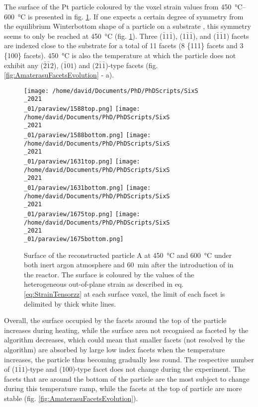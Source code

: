 The surface of the Pt particle coloured by the voxel strain values from \qtyrange{450}{600}{\degreeCelsius} is presented in fig. \ref{fig:AmaterasuB}.
If one expects a certain degree of symmetry from the equilibrium Winterbottom shape of a particle on a substrate \parencite{Winterbottom1967, Boukouvala2021}, this symmetry seems to only be reached at \qty{450}{\degreeCelsius} (fig. \ref{fig:AmaterasuB}).
Three ($\bar{1}1\bar{1}$), (1$\bar{1}\bar{1}$), and ($\bar{1}\bar{1}$1) facets are indexed close to the substrate for a total of 11 facets (8 \{111\} facets and 3 \{100\} facets).
\qty{450}{\degreeCelsius} is also the temperature at which the particle does not exhibit any ($\bar{2}\bar{1}2$), ($\bar{1}01$) and ($2\bar{1}\bar{1}$)-type facets (fig. \ref{fig:AmaterasuFacetsEvolution} - a).

\begin{figure}[!htb]
    \centering
    \texttt{[image: /home/david/Documents/PhD/PhDScripts/SixS\\\_2021\\\_01/paraview/1588top.png]}
    \texttt{[image: /home/david/Documents/PhD/PhDScripts/SixS\\\_2021\\\_01/paraview/1588bottom.png]}
    \texttt{[image: /home/david/Documents/PhD/PhDScripts/SixS\\\_2021\\\_01/paraview/1631top.png]}
    \texttt{[image: /home/david/Documents/PhD/PhDScripts/SixS\\\_2021\\\_01/paraview/1631bottom.png]}
    \texttt{[image: /home/david/Documents/PhD/PhDScripts/SixS\\\_2021\\\_01/paraview/1675top.png]}
    \texttt{[image: /home/david/Documents/PhD/PhDScripts/SixS\\\_2021\\\_01/paraview/1675bottom.png]}
    \caption{
        Surface of the reconstructed particle A at \qty{450}{\degreeCelsius} and \qty{600}{\degreeCelsius} under both inert argon atmosphere and \qty{60}{\minute} after the introduction of  in the reactor.
        The surface is coloured by the values of the heterogeneous out-of-plane strain as described in eq. \ref{eq:StrainTensorzz} at each surface voxel, the limit of each facet is delimited by thick white lines.
    }
    \label{fig:AmaterasuB}
\end{figure}

Overall, the surface occupied by the facets around the top of the particle increases during heating, while the surface area not recognised as faceted by the algorithm decreases, which could mean that smaller facets (not resolved by the algorithm) are absorbed by large low index facets when the temperature increases, the particle thus becoming gradually less round.
The respective number of ($1\bar{1}1$)-type and (100)-type facet does not change during the experiment.
The facets that are around the bottom of the particle are the most subject to change during this temperature ramp, while the facets at the top of particle are more stable (fig. \ref{fig:AmaterasuFacetsEvolution}).

